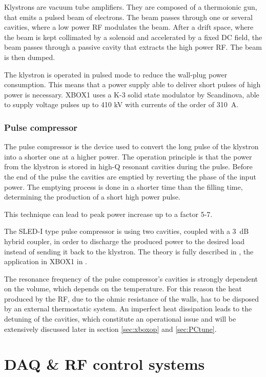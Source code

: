 Klystrons are vacuum tube amplifiers. They are composed of a thermoionic gun, that emits a pulsed beam of electrons. The beam passes through one or several cavities, where a low power RF modulates the beam. After a drift space, where the beam is kept collimated by a solenoid and accelerated by a fixed DC field, the beam passes through a passive cavity that extracts the high power RF. The beam is then dumped. 

The klystron is operated in pulsed mode to reduce the wall-plug power consumption. This means that a power supply able to deliver short pulses of high power is necessary. XBOX1 uses a K-3 solid state modulator by Scandinova, able to supply voltage pulses up to 410 kV with currents of the order of 310~A.


\subsubsection{Pulse compressor}

The pulse compressor is the device used to convert the long pulse of the klystron into a shorter one at a higher power. The operation principle is that the power from the klystron is stored in high-Q resonant cavities during the pulse. Before the end of the pulse the cavities are emptied by reverting the phase of the input power. The emptying process is done in a shorter time than the filling time, determining the production of a short high power pulse. 

This technique can lead to peak power increase up to a factor 5-7. 

The SLED-I type pulse compressor is using two cavities, coupled with a 3~dB hybrid coupler, in order to discharge the produced power to the desired load instead of sending it back to the klystron. The theory is fully described in \cite{Fiebig:209756}, the application in XBOX1 in \cite{SLED:ctf3}.

The resonance frequency of the pulse compressor's cavities is strongly dependent on the volume, which depends on the temperature. For this reason the heat produced by the RF, due to the ohmic resistance of the walls, has to be disposed by an external thermostatic system. An imperfect heat dissipation leads to the detuning of the cavities, which constitute an operational issue and will be extensively discussed later in section \ref{sec:xboxop} and \ref{sec:PCtune}.

 


\section[DAQ \& RF control systems]{DAQ \& RF control systems}
\label{sec:RF_and_DAQ_s}

